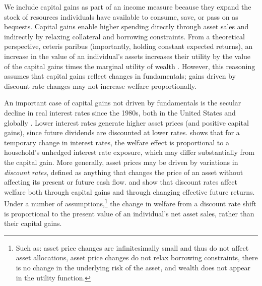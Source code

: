 We include capital gains as part of an income measure because they expand the stock of resources individuals have available to consume, save, or pass on as bequests. Capital gains enable higher spending directly through asset sales and indirectly by relaxing collateral and borrowing constraints. From a theoretical perspective, ceteris paribus (importantly, holding constant expected returns), an increase in the value of an individual's assets increases their utility by the value of the capital gains times the marginal utility of wealth \citep{cochrane2011discount}. However, this reasoning assumes that capital gains reflect changes in fundamentals; gains driven by discount rate changes may not increase welfare proportionally.

An important case of capital gains not driven by fundamentals is the secular decline in real interest rates since the 1980s, both in the United States \citep{eggertsson2019model} and globally \citep{rachel2019secular}. Lower interest rates generate higher asset prices (and positive capital gains), since future dividends are discounted at lower rates. \citet{auclert2019monetary} shows that for a temporary change in interest rates, the welfare effect is proportional to a household's unhedged interest rate exposure, which may differ substantially from the capital gain. More generally, asset prices may be driven by variations in \textit{discount rates}, defined as anything that changes the price of an asset without affecting its present or future cash flow. \citet{fagereng2025asset} and \citet{aguiar2024putting} show that discount rates affect welfare both through capital gains and through changing effective future returns. Under a number of assumptions,\footnote{Such as: asset price changes are infinitesimally small and thus do not affect asset allocations, asset price changes do not relax borrowing constraints, there is no change in the underlying risk of the asset, and wealth does not appear in the utility function.} the change in welfare from a discount rate shift is proportional to the present value of an individual's net asset sales, rather than their capital gains.

